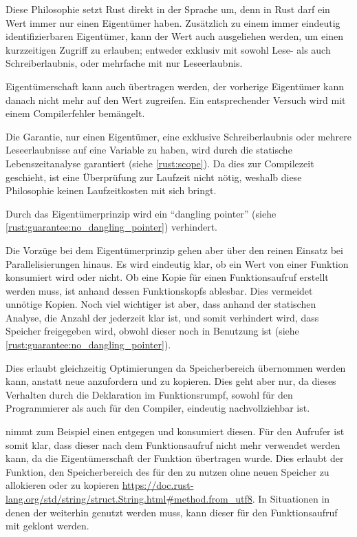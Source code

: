 Diese Philosophie setzt Rust direkt in der Sprache um, denn in Rust darf ein Wert immer nur einen Eigentümer haben.
Zusätzlich zu einem immer eindeutig identifizierbaren Eigentümer, kann der Wert auch ausgeliehen werden, um einen kurzzeitigen Zugriff zu erlauben; entweder exklusiv mit sowohl Lese- als auch Schreiberlaubnis, oder mehrfache mit nur Leseerlaubnis.

Eigentümerschaft kann auch übertragen werden, der vorherige Eigentümer kann danach nicht mehr auf den Wert zugreifen.
Ein entsprechender Versuch wird mit einem Compilerfehler bemängelt.

Die Garantie, nur einen Eigentümer, eine exklusive Schreiberlaubnis oder mehrere Leseerlaubnisse auf eine Variable zu haben, wird durch die statische Lebenszeitanalyse garantiert (siehe \autoref{rust:scope}).
Da dies zur Compilezeit geschieht, ist eine Überprüfung zur Laufzeit nicht nötig, weshalb diese Philosophie keinen Laufzeitkosten mit sich bringt.

Durch das Eigentümerprinzip wird ein \enquote{dangling pointer} (siehe \autoref{rust:guarantee:no_dangling_pointer}) verhindert.


Die Vorzüge bei dem Eigentümerprinzip gehen aber über den reinen Einsatz bei Parallelisierungen hinaus.
Es wird eindeutig klar, ob ein Wert von einer Funktion konsumiert wird oder nicht.
Ob eine Kopie für einen Funktionsaufruf erstellt werden muss, ist anhand dessen Funktionskopfs ablesbar.
Dies vermeidet unnötige Kopien.
Noch viel wichtiger ist aber, dass anhand der statischen Analyse, die Anzahl der  jederzeit klar ist, und somit verhindert wird, dass Speicher freigegeben wird, obwohl dieser noch in Benutzung ist (siehe \autoref{rust:guarantee:no_dangling_pointer}).

Dies erlaubt gleichzeitig Optimierungen da Speicherbereich übernommen werden kann, anstatt neue anzufordern und zu kopieren.
Dies geht aber nur, da dieses Verhalten durch die Deklaration im Funktionsrumpf, sowohl für den Programmierer als auch für den Compiler, eindeutig nachvollziehbar ist.

 nimmt zum Beispiel einen  entgegen und konsumiert diesen.
Für den Aufrufer ist somit klar, dass dieser nach dem Funktionsaufruf nicht mehr verwendet werden kann, da die Eigentümerschaft der Funktion  übertragen wurde.
Dies erlaubt der Funktion, den Speicherbereich des  für den  zu nutzen ohne neuen Speicher zu allokieren oder zu kopieren  \url{https://doc.rust-lang.org/std/string/struct.String.html#method.from_utf8}.
In Situationen in denen der  weiterhin genutzt werden muss, kann dieser für den Funktionsaufruf mit  geklont werden.

